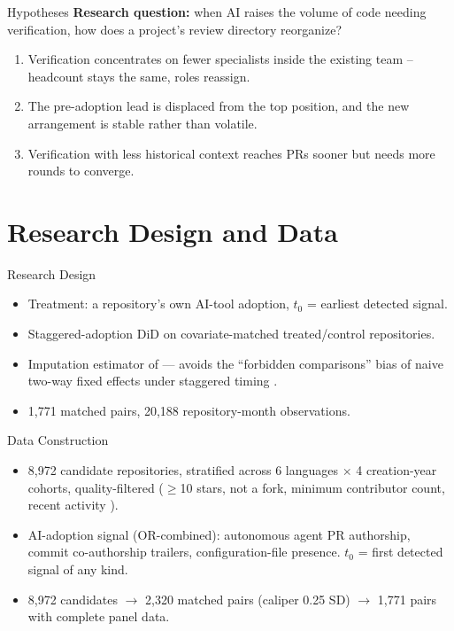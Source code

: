 \begin{frame}{Hypotheses}
\textbf{Research question:} when AI raises the volume of code needing
verification, how does a project's review directory reorganize?
\begin{enumerate}
  \item[H1] Verification concentrates on fewer specialists inside the
        existing team -- headcount stays the same, roles reassign.
  \item[H2] The pre-adoption lead is displaced from the top position,
        and the new arrangement is stable rather than volatile.
  \item[H3] Verification with less historical context reaches PRs
        sooner but needs more rounds to converge.
\end{enumerate}
\end{frame}

\section{Research Design and Data}

\begin{frame}{Research Design}
\begin{itemize}
  \item Treatment: a repository's own AI-tool adoption, $t_0$ =
        earliest detected signal.
  \item Staggered-adoption DiD on covariate-matched treated/control
        repositories.
  \item Imputation estimator of \cite{borusyak2024revisiting} ---
        avoids the ``forbidden comparisons'' bias of naive two-way
        fixed effects under staggered timing
        \cite{goodman2021difference,callaway2021difference}.
  \item 1,771 matched pairs, 20,188 repository-month observations.
\end{itemize}
\end{frame}

\begin{frame}{Data Construction}
\begin{itemize}
  \item 8,972 candidate repositories, stratified across 6 languages
        $\times$ 4 creation-year cohorts, quality-filtered ($\geq$10
        stars, not a fork, minimum contributor count, recent activity
        \cite{munaiah2017curating}).
  \item AI-adoption signal (OR-combined): autonomous agent PR
        authorship, commit co-authorship trailers, configuration-file
        presence. $t_0$ = first detected signal of any kind.
  \item[] 8,972 candidates $\rightarrow$ 2,320 matched pairs (caliper
        0.25 SD) $\rightarrow$ 1,771 pairs with complete panel data.
\end{itemize}
\end{frame}

